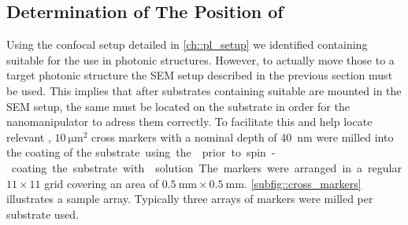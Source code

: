 	\subsection{Determination of The Position of \Nds} \label{subsec::position}

		Using the confocal setup detailed in \autoref{ch::pl_setup} we identified \nds containing \sivs suitable for the use in photonic structures. However, to actually move those \nds to a target photonic structure the SEM setup described in the previous section must be used. This implies that after substrates containing suitable \nds are mounted in the SEM setup, the same \nds must be located on the substrate in order for the nanomanipulator to adress them correctly.
		To facilitate this and help locate relevant \nds, $\SI{10}{\micro\meter\squared}$ cross markers with a nominal depth of \SI{40}{\nm} were milled into the \ir coating of the \si substrate using the \fib prior to spin-coating the substrate with \nd solution. The markers were arranged in a regular $11 \times 11$ grid covering an area of $\SI{0.5}{\milli\meter} \times \SI{0.5}{\milli\meter}$. \autoref{subfig::cross_markers} illustrates a sample array. Typically three arrays of markers were milled per substrate used.

